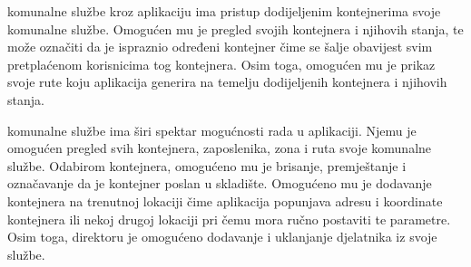 		 komunalne službe kroz aplikaciju ima pristup dodijeljenim kontejnerima svoje komunalne službe.
		Omogućen mu je pregled svojih kontejnera i njihovih stanja, te može označiti da je ispraznio određeni kontejner čime se šalje obavijest svim pretplaćenom korisnicima tog kontejnera.
		Osim toga, omogućen mu je prikaz svoje rute koju aplikacija generira na temelju dodijeljenih kontejnera i njihovih stanja. 
		
		
		 komunalne službe ima širi spektar mogućnosti rada u aplikaciji. 
		Njemu je omogućen pregled svih kontejnera, zaposlenika, zona i ruta svoje komunalne službe. 
		Odabirom kontejnera, omogućeno mu je brisanje, premještanje i označavanje da je kontejner poslan u skladište.
		Omogućeno mu je dodavanje kontejnera na trenutnoj lokaciji čime aplikacija popunjava adresu i koordinate kontejnera ili nekoj drugoj lokaciji pri čemu mora ručno postaviti te parametre.
		Osim toga, direktoru je omogućeno dodavanje i uklanjanje djelatnika iz svoje službe.
		
		
		\eject
	